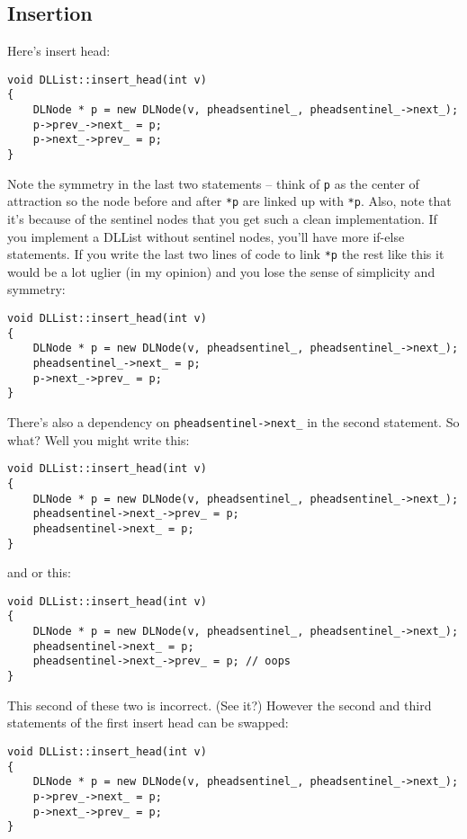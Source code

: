 \subsection{Insertion}
Here's insert head:
\begin{Verbatim}[frame=single,fontsize=\footnotesize]
void DLList::insert_head(int v)
{
    DLNode * p = new DLNode(v, pheadsentinel_, pheadsentinel_->next_);
    p->prev_->next_ = p;
    p->next_->prev_ = p;
}
\end{Verbatim}
Note the symmetry in the last two statements -- think of \verb!p! as the
center of attraction so the node before and after \verb!*p! are linked up
with \verb!*p!.
Also, note that it's because of the sentinel nodes that you get
such a clean implementation. If you implement a DLList without
sentinel nodes, you'll have more if-else statements.
If you write the last two lines of code to link \verb!*p! the rest like this
it would be a lot uglier (in my opinion)
and you lose the sense of simplicity and symmetry:
\begin{Verbatim}[frame=single,fontsize=\footnotesize]
void DLList::insert_head(int v)
{
    DLNode * p = new DLNode(v, pheadsentinel_, pheadsentinel_->next_);
    pheadsentinel_->next_ = p;
    p->next_->prev_ = p;
}
\end{Verbatim}
There's also a dependency on \verb!pheadsentinel->next_! in the second
statement.
So what?
Well you might write this:
\begin{Verbatim}[frame=single,fontsize=\footnotesize]
void DLList::insert_head(int v)
{
    DLNode * p = new DLNode(v, pheadsentinel_, pheadsentinel_->next_);
    pheadsentinel->next_->prev_ = p;
    pheadsentinel->next_ = p;
}
\end{Verbatim}
and or this:
\begin{Verbatim}[frame=single,fontsize=\footnotesize]
void DLList::insert_head(int v)
{
    DLNode * p = new DLNode(v, pheadsentinel_, pheadsentinel_->next_);
    pheadsentinel->next_ = p;
    pheadsentinel->next_->prev_ = p; // oops 
}
\end{Verbatim}
This second of these two is incorrect. (See it?)
However the second and third statements of the first
insert head can be swapped:
\begin{Verbatim}[frame=single,fontsize=\footnotesize]
void DLList::insert_head(int v)
{
    DLNode * p = new DLNode(v, pheadsentinel_, pheadsentinel_->next_);
    p->prev_->next_ = p;
    p->next_->prev_ = p;
}
\end{Verbatim}

